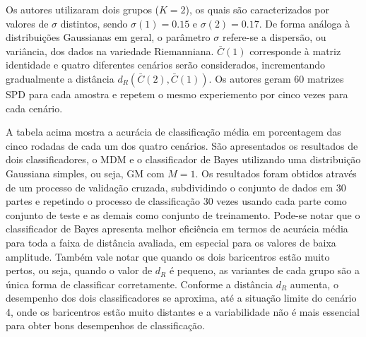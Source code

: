 \documentclass[a4paper,titlepage]{article}
\begin{document}
Os autores utilizaram dois grupos ($K=2$), os quais são caracterizados por
valores de $\sigma$ distintos, sendo $\sigma(1) = 0.15$ e $\sigma(2) = 0.17$.
De forma análoga à distribuições Gaussianas em geral, o parâmetro $\sigma$
refere-se a dispersão, ou variância, dos dados na variedade Riemanniana.  
$\bar{C}(1)$ corresponde à matriz identidade e quatro diferentes cenários serão
considerados, incrementando gradualmente a distância
$d_R(\bar{C}(2), \bar{C}(1))$. Os autores geram 60 matrizes SPD para cada
amostra e repetem o mesmo experiemento por cinco vezes para cada cenário.

\begin{center}
  \vspace{1em}
  \vspace{1em}
\end{center}

A tabela acima mostra a acurácia de classificação média em porcentagem das
cinco rodadas de cada um dos quatro cenários. São apresentados os resultados
de dois classificadores, o MDM e o classificador de Bayes utilizando uma
distribuição Gaussiana simples, ou seja, GM com $M=1$. Os resultados foram
obtidos através de um processo de validação cruzada, subdividindo o conjunto de
dados em 30 partes e repetindo o processo de classificação 30 vezes usando cada
parte como conjunto de teste e as demais como conjunto de treinamento.
Pode-se notar que o classificador de Bayes apresenta melhor eficiência em
termos de acurácia média para toda a faixa de distância avaliada, em especial
para os valores de baixa amplitude. Também vale notar que quando os dois
baricentros estão muito pertos, ou seja, quando o valor de $d_R$ é pequeno,
as variantes de cada grupo são a única forma de classificar corretamente.
Conforme a distância $d_R$ aumenta, o desempenho dos dois classificadores se
aproxima, até a situação limite do cenário 4, onde os baricentros estão muito
distantes e a variabilidade não é mais essencial para obter bons desempenhos de
classificação.
\end{document}
